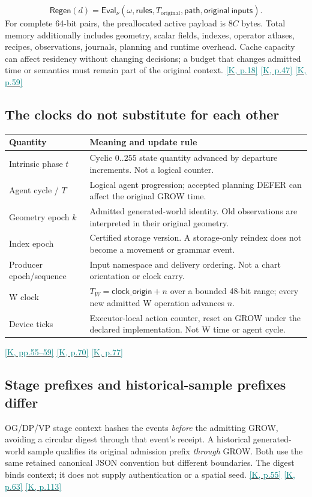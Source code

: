 \documentclass[11pt,a4paper]{article}
\newcommand{\kref}[1]{\hyperlink{baseline.#1}{\textcolor{teal}{[K, p.#1]}}}
\newcommand{\krange}[2]{\hyperlink{baseline.#1}{\textcolor{teal}{[K, pp.#1--#2]}}}
\theoremstyle{lpstyle}
\begin{document}
\[
\mathsf{Regen}(d)=\mathsf{Eval}_\nu(\omega,\mathsf{rules},T_{\mathrm{original}},
\mathsf{path},\mathsf{original\ inputs}).
\]
For complete 64-bit pairs, the preallocated active payload is $8C$ bytes. Total memory additionally includes geometry, scalar fields, indexes, operator atlases, recipes, observations, journals, planning and runtime overhead. Cache capacity can affect residency without changing decisions; a budget that changes admitted time or semantics must remain part of the original context. \kref{18} \kref{47} \kref{59}

\subsection{The clocks do not substitute for each other}
\begin{tabularx}{\textwidth}{L{36mm}Y}
\toprule
\textbf{Quantity}&\textbf{Meaning and update rule}\\\midrule
Intrinsic phase $t$&Cyclic $0..255$ state quantity advanced by departure increments. Not a logical counter.\\
Agent cycle / $T$&Logical agent progression; accepted planning DEFER can affect the original GROW time.\\
Geometry epoch $k$&Admitted generated-world identity. Old observations are interpreted in their original geometry.\\
Index epoch&Certified storage version. A storage-only reindex does not become a movement or grammar event.\\
Producer epoch/sequence&Input namespace and delivery ordering. Not a chart orientation or clock carry.\\
W clock&$T_W=\mathsf{clock\_origin}+n$ over a bounded 48-bit range; every new admitted W operation advances $n$.\\
Device ticks&Executor-local action counter, reset on GROW under the declared implementation. Not W time or agent cycle.\\\bottomrule
\end{tabularx}
\krange{55}{59} \kref{70} \kref{77}

\subsection{Stage prefixes and historical-sample prefixes differ}
OG/DP/VP stage context hashes the events \emph{before} the admitting GROW, avoiding a circular digest through that event's receipt. A historical generated-world sample qualifies its original admission prefix \emph{through} GROW. Both use the same retained canonical JSON convention but different boundaries. The digest binds context; it does not supply authentication or a spatial seed. \kref{55} \kref{63} \kref{113}
\end{document}
